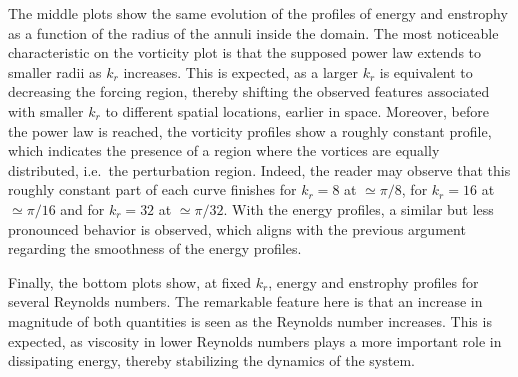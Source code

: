 \documentclass[../main.tex]{subfiles}
\begin{document}
The middle plots show the same evolution of the profiles of energy and enstrophy as a function of the radius of the annuli inside the domain. The most noticeable characteristic on the vorticity plot is that the supposed power law extends to smaller radii as $k_r$ increases. This is expected, as a larger $k_r$ is equivalent to decreasing the forcing region, thereby shifting the observed features associated with smaller $k_r$ to different spatial locations, earlier in space. Moreover, before the power law is reached, the vorticity profiles show a roughly constant profile, which indicates the presence of a region where the vortices are equally distributed, i.e.\ the perturbation region. Indeed, the reader may observe that this roughly constant part of each curve finishes for $k_r=8$ at $\simeq \pi/8$, for $k_r=16$ at $\simeq \pi/16$ and for $k_r=32$ at $\simeq \pi/32$. With the energy profiles, a similar but less pronounced behavior is observed, which aligns with the previous argument regarding the smoothness of the energy profiles.

Finally, the bottom plots show, at fixed $k_r$, energy and enstrophy profiles for several Reynolds numbers. The remarkable feature here is that an increase in magnitude of both quantities is seen as the Reynolds number increases. This is expected, as viscosity in lower Reynolds numbers plays a more important role in dissipating energy, thereby stabilizing the dynamics of the system.
\end{document}
